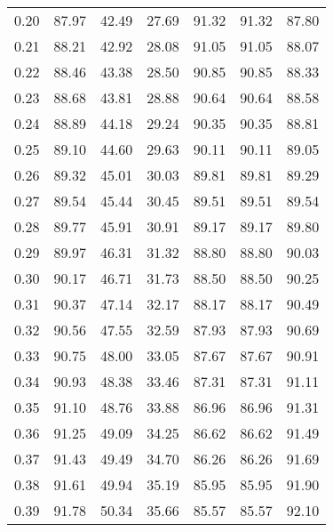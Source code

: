 \begin{tabular}{|c|c|c|c|c|c|c|}
      0.20 &     87.97 &     42.49 &      27.69 &   91.32 &      91.32 &         87.80 \\
      0.21 &     88.21 &     42.92 &      28.08 &   91.05 &      91.05 &         88.07 \\
      0.22 &     88.46 &     43.38 &      28.50 &   90.85 &      90.85 &         88.33 \\
      0.23 &     88.68 &     43.81 &      28.88 &   90.64 &      90.64 &         88.58 \\
      0.24 &     88.89 &     44.18 &      29.24 &   90.35 &      90.35 &         88.81 \\
      0.25 &     89.10 &     44.60 &      29.63 &   90.11 &      90.11 &         89.05 \\
      0.26 &     89.32 &     45.01 &      30.03 &   89.81 &      89.81 &         89.29 \\
      0.27 &     89.54 &     45.44 &      30.45 &   89.51 &      89.51 &         89.54 \\
      0.28 &     89.77 &     45.91 &      30.91 &   89.17 &      89.17 &         89.80 \\
      0.29 &     89.97 &     46.31 &      31.32 &   88.80 &      88.80 &         90.03 \\
      0.30 &     90.17 &     46.71 &      31.73 &   88.50 &      88.50 &         90.25 \\
      0.31 &     90.37 &     47.14 &      32.17 &   88.17 &      88.17 &         90.49 \\
      0.32 &     90.56 &     47.55 &      32.59 &   87.93 &      87.93 &         90.69 \\
      0.33 &     90.75 &     48.00 &      33.05 &   87.67 &      87.67 &         90.91 \\
      0.34 &     90.93 &     48.38 &      33.46 &   87.31 &      87.31 &         91.11 \\
      0.35 &     91.10 &     48.76 &      33.88 &   86.96 &      86.96 &         91.31 \\
      0.36 &     91.25 &     49.09 &      34.25 &   86.62 &      86.62 &         91.49 \\
      0.37 &     91.43 &     49.49 &      34.70 &   86.26 &      86.26 &         91.69 \\
      0.38 &     91.61 &     49.94 &      35.19 &   85.95 &      85.95 &         91.90 \\
      0.39 &     91.78 &     50.34 &      35.66 &   85.57 &      85.57 &         92.10 \\

\end{tabular}
